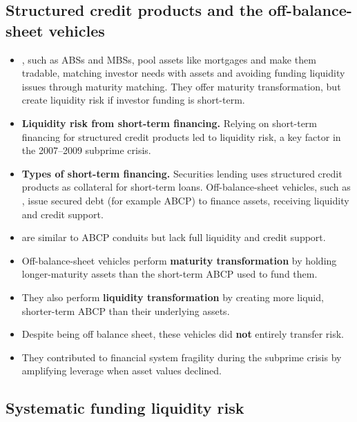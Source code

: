 \subsection{Structured credit products and the off-balance-sheet vehicles}

\begin{itemize}
\item {}, such as ABSs and MBSs, pool assets like mortgages and make them tradable, matching investor needs with assets and avoiding funding liquidity issues through maturity matching. They offer maturity transformation, but create liquidity risk if investor funding is short-term.
\item \textbf{Liquidity risk from short-term financing.} Relying on short-term financing for structured credit products led to liquidity risk, a key factor in the 2007--2009 subprime crisis.
\item \textbf{Types of short-term financing.} Securities lending uses structured credit products as collateral for short-term loans. Off-balance-sheet vehicles, such as , issue secured debt (for example ABCP) to finance assets, receiving liquidity and credit support.
\item {} are similar to ABCP conduits but lack full liquidity and credit support.
\end{itemize}

\begin{lrkeybox}
\begin{itemize}
\item Off-balance-sheet vehicles perform \textbf{maturity transformation} by holding longer-maturity assets than the short-term ABCP used to fund them.
\item They also perform \textbf{liquidity transformation} by creating more liquid, shorter-term ABCP than their underlying assets.
\item Despite being off balance sheet, these vehicles did \textbf{not} entirely transfer risk.
\item They contributed to financial system fragility during the subprime crisis by amplifying leverage when asset values declined.
\end{itemize}
\end{lrkeybox}

\subsection{Systematic funding liquidity risk}

